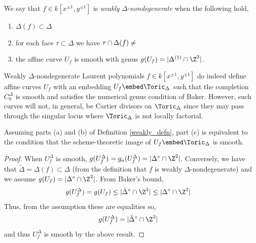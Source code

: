 \begin{defn} \label{weakly_defn}
We say that $f \in k[x^{\pm 1}, y^{\pm 1}]$ is \textit{weakly} $\Delta$-\textit{nondegenerate} when the following hold,
\begin{enumerate}
\item $\Delta(f) \subset \Delta$
\item for each face $\tau \subset \Delta$ we have $\tau \cap \Delta(f) \neq \empty$
\item the affine curve $U_f$ is smooth with genus $g(U_f) = | \Delta^{(1)} \cap \Z^2 |$. 
\end{enumerate}
\end{defn}
\noindent
Weakly $\Delta$-nondegenerate Laurent polynomials $f \in k[x^{\pm 1}, y^{\pm 1}]$ do indeed define affine curves $U_f$ with an embedding $U_f \embed \Toric_\Delta$ such that the completion $C_0^\Delta$ is smooth and satisfies the numerical genus condition of Baker. However, such curves will not, in general, be Cartier divisors on $\Toric_\Delta$ since they may pass through the singular locus where $\Toric_\Delta$ is not locally factorial. 

\begin{lemma}
Assuming parts (a) and (b) of Definition \ref{weakly_defn}, part (c) is equivalent to the condition that the scheme-theoretic image of $U_f \embed \Toric_\Delta$ is smooth. 
\end{lemma}

\begin{proof}
When $U_f^\Delta$ is smooth, $g(U_f^\Delta) = g_a(U_f^\Delta) = | \Delta^\circ \cap \Z^2|$. Conversely, we have that $\tilde{\Delta} = \Delta(f) \subset \Delta$ (from the definition that $f$ is weakly $\Delta$-nondegenerate) and we assume $g(U_f) = | \Delta^\circ \cap \Z^2 |$. From Baker's bound,
\[ g(U_f^\Delta) = g(U_f) \le |\tilde{\Delta}^\circ \cap \Z^2| \le |\Delta^\circ \cap \Z^2 | \] 
Thus, from the assumption these are equalities so,
\[ g(U_f^\Delta) = | \tilde{\Delta}^\circ \cap \Z^2 | \]
and thus $U_f^\Delta$ is smooth by the above result.
\end{proof}


